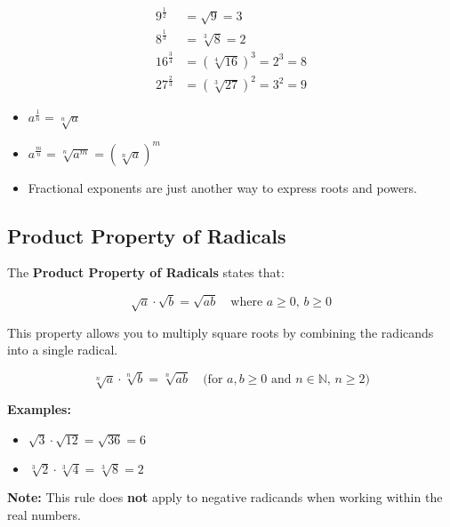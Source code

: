 \documentclass[11pt]{article}
\begin{document}
\begin{align*}
  9^{\frac{1}{2}} &= \sqrt{9} = 3 \\
  8^{\frac{1}{3}} &= \sqrt[3]{8} = 2 \\
  16^{\frac{3}{4}} &= \left( \sqrt[4]{16} \right)^3 = 2^3 = 8 \\
  27^{\frac{2}{3}} &= \left( \sqrt[3]{27} \right)^2 = 3^2 = 9
\end{align*}

\begin{tcolorbox}[colback=cyan!5!white, colframe=cyan!80!black, title=Fractional Exponents Summary]
\begin{itemize}
  \item \( a^{\frac{1}{n}} = \sqrt[n]{a} \)
  \item \( a^{\frac{m}{n}} = \sqrt[n]{a^m} = \left( \sqrt[n]{a} \right)^m \)
  \item Fractional exponents are just another way to express roots and powers.
\end{itemize}
\end{tcolorbox}

\subsection{Product Property of Radicals}

The \textbf{Product Property of Radicals} states that:

\[
\sqrt{a} \cdot \sqrt{b} = \sqrt{ab}
\quad \text{where } a \geq 0,\, b \geq 0
\]

This property allows you to multiply square roots by combining the radicands into a single radical.

\begin{tcolorbox}[colback=blue!5!white, colframe=blue!75!black, title=Product Property of Radicals]
\[
\sqrt[n]{a} \cdot \sqrt[n]{b} = \sqrt[n]{ab}
\quad \text{(for } a, b \geq 0 \text{ and } n \in \mathbb{N},\, n \geq 2 \text{)}
\]
\end{tcolorbox}

\textbf{Examples:}
\begin{itemize}
  \item \( \sqrt{3} \cdot \sqrt{12} = \sqrt{36} = 6 \)
  \item \( \sqrt[3]{2} \cdot \sqrt[3]{4} = \sqrt[3]{8} = 2 \)
\end{itemize}

\textbf{Note:} This rule does \textbf{not} apply to negative radicands when working within the real numbers.
\end{document}
